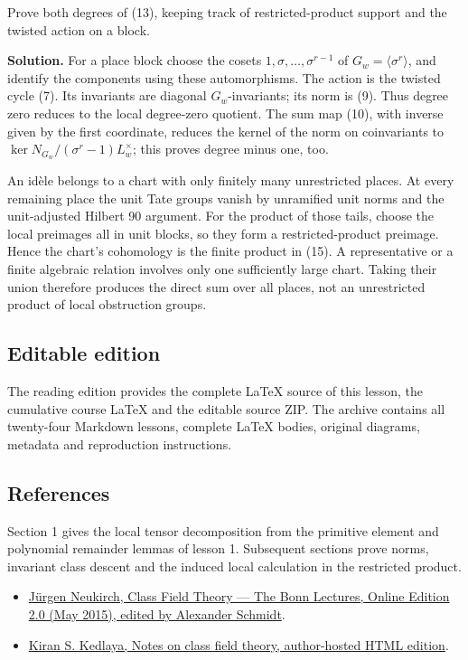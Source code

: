 \documentclass[11pt,a4paper]{article}
\newcommand{\tightlist}{\setlength{\itemsep}{0pt}\setlength{\parskip}{0pt}}
\begin{document}
Prove both degrees of (13), keeping track of restricted-product support
and the twisted action on a block.

\textbf{Solution.} For a place block choose the cosets
\(1,\sigma,\ldots,\sigma^{r-1}\) of \(G_w=\langle\sigma^r\rangle\), and
identify the components using these automorphisms. The action is the
twisted cycle (7). Its invariants are diagonal \(G_w\)-invariants; its
norm is (9). Thus degree zero reduces to the local degree-zero quotient.
The sum map (10), with inverse given by the first coordinate, reduces
the kernel of the norm on coinvariants to
\(\ker N_{G_w}/(\sigma^r-1)L_w^\times\); this proves degree minus one,
too.

An idèle belongs to a chart with only finitely many unrestricted places.
At every remaining place the unit Tate groups vanish by unramified unit
norms and the unit-adjusted Hilbert 90 argument. For the product of
those tails, choose the local preimages all in unit blocks, so they form
a restricted-product preimage. Hence the chart's cohomology is the
finite product in (15). A representative or a finite algebraic relation
involves only one sufficiently large chart. Taking their union therefore
produces the direct sum over all places, not an unrestricted product of
local obstruction groups.

\subsection{Editable edition}\label{editable-edition}

The reading edition provides the complete LaTeX source of this lesson,
the cumulative course LaTeX and the editable source ZIP. The archive
contains all twenty-four Markdown lessons, complete LaTeX bodies,
original diagrams, metadata and reproduction instructions.

\subsection{References}\label{references}

Section 1 gives the local tensor decomposition from the primitive
element and polynomial remainder lemmas of lesson 1. Subsequent sections
prove norms, invariant class descent and the induced local calculation
in the restricted product.

\begin{itemize}
\tightlist
\item
  \href{https://www.mathi.uni-heidelberg.de/~schmidt/Neukirch-en/Neukirch_cft_02_may15.pdf}{Jürgen
  Neukirch, Class Field Theory --- The Bonn Lectures, Online Edition 2.0
  (May 2015), edited by Alexander Schmidt}.
\item
  \href{https://kskedlaya.org/cft/sec_abstractcft1.html}{Kiran S.
  Kedlaya, Notes on class field theory, author-hosted HTML edition}.
\end{itemize}
\end{document}
